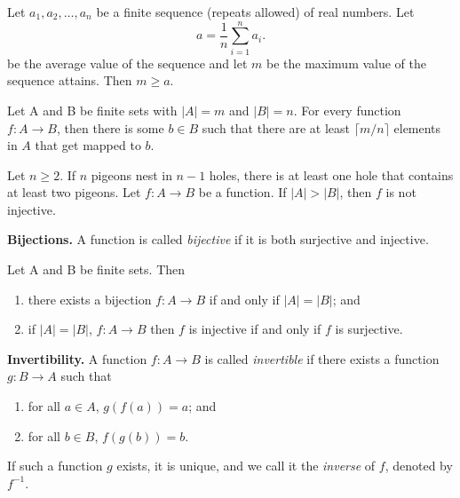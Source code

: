 \documentclass{tufte-handout}
\begin{document}
\begin{Theorem}
    Let \( a_1,a_2,\ldots,a_n \) be a finite sequence (repeats allowed) of real numbers. Let
    \[a = \frac{1}{n} \sum_{i=1}^{n} a_i.\]
    be the average value of the sequence and let \( m \) 
    be the maximum value of the sequence attains. Then \( m \geq a \).
\end{Theorem}

\begin{Theorem}
    Let A and B be finite sets with \( \left|A\right| = m\) and \( \left|B\right| = n \).
    For every function \( f:A \to B \), then there is some \( b \in B \) such that
    there are at least \( \lceil m/n \rceil \) elements in \( A \) that get mapped to \( b \).
\end{Theorem}

\begin{Corollary}
    Let \( n \geq 2 \). If \( n \) pigeons nest in \( n-1 \) holes, there is at least one hole that contains at least two pigeons.
    Let \( f:A \to B \) be a function. 
    If \( \left|A\right| > \left|B\right| \), then \( f \) is not injective.
\end{Corollary}

\textbf{Bijections.} A function is called \textit{bijective} if it is both surjective and injective.

\begin{Proposition}
    Let A and B be finite sets. Then
    \begin{enumerate}
        \item there exists a bijection \( f:A\to B \) if and only if \( \left|A\right| = \left|B\right| \); and
        \item if \(\left|A\right| = \left|B\right| \), \( f:A\to B \) then \( f \) is injective if and only if \( f \) is surjective.
    \end{enumerate}
\end{Proposition}

\textbf{Invertibility.} A function \( f:A\to B \) is called \textit{invertible} if there exists a function \( g:B\to A \) such that
\begin{enumerate}
    \item for all \( a \in A \), \( g(f(a)) = a \); and
    \item for all \( b \in B \), \( f(g(b)) = b \).
\end{enumerate}
If such a function \( g \) exists, it is unique, and we call it the \textit{inverse} of \( f \), denoted by \( f^{-1} \).
\end{document}
